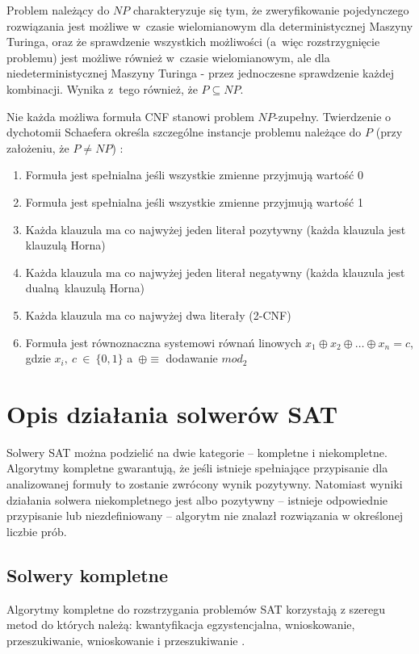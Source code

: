 Problem należący do $NP$ charakteryzuje się tym, że zweryfikowanie pojedynczego rozwiązania jest możliwe w~czasie wielomianowym
dla deterministycznej Maszyny Turinga, oraz że sprawdzenie wszystkich możliwości (a~więc rozstrzygnięcie problemu) jest możliwe
również w~czasie wielomianowym, ale dla niedeterministycznej Maszyny Turinga - przez jednoczesne sprawdzenie każdej kombinacji. 
Wynika z~tego również, że $P \subseteq NP$.

Nie każda możliwa formuła CNF stanowi problem $NP$-zupełny. Twierdzenie o dychotomii Schaefera określa 
szczególne instancje problemu należące do $P$ (przy założeniu, że $P \neq NP$) \cite{schaefer-dichotomy}:

\begin{enumerate}
    \item Formuła jest spełnialna jeśli wszystkie zmienne przyjmują wartość 0
    \item Formuła jest spełnialna jeśli wszystkie zmienne przyjmują wartość 1
    \item Każda klauzula ma co najwyżej jeden literał pozytywny (każda klauzula jest klauzulą Horna)
    \item Każda klauzula ma co najwyżej jeden literał negatywny (każda klauzula jest dualną klauzulą Horna)
    \item Każda klauzula ma co najwyżej dwa literały (2-CNF)
    \item Formuła jest równoznaczna systemowi równań linowych $x_1 \oplus x_2 \oplus \dots \oplus x_n = c$, gdzie
    $x_i,~c~\in~\{0, 1\}$ a~$\oplus \equiv$ dodawanie $mod_2$
    
\end{enumerate}

\section{Opis działania solwerów SAT}
Solwery SAT można podzielić na dwie kategorie -- kompletne i niekompletne.
Algorytmy kompletne gwarantują, że jeśli istnieje spełniające przypisanie dla analizowanej formuły to zostanie zwrócony wynik pozytywny.
Natomiast wyniki działania solwera niekompletnego jest albo pozytywny -- istnieje odpowiednie przypisanie lub niezdefiniowany -- algorytm nie
znalazł rozwiązania w określonej liczbie prób.

\subsection{Solwery kompletne}
Algorytmy kompletne do rozstrzygania problemów SAT korzystają z szeregu metod do których należą: 
kwantyfikacja egzystencjalna, wnioskowanie, przeszukiwanie, wnioskowanie i przeszukiwanie \cite{handbook-satifiability-complete}.

